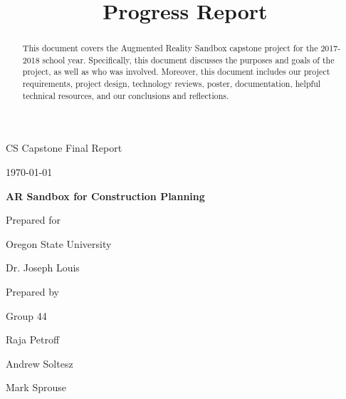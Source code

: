\documentclass[onecolumn, draftclsnofoot,10pt, compsoc]{IEEEtran}
\title{Progress Report}
\def \CapstoneTeamName{		Team Sandy}
\def \CapstoneTeamNumber{		44}
\def \GroupMemberOne{			Raja Petroff			}
\def \GroupMemberTwo{			Andrew Soltesz			}
\def \GroupMemberThree{			Mark Sprouse			}
\def \CapstoneProjectName{		AR Sandbox for Construction Planning}
\def \CapstoneSponsorCompany{	Oregon State University}
\def \CapstoneSponsorPerson{		Dr. Joseph Louis}
\def \DocType{		%
				Final Report
				}
\newcommand{\NameSigPair}[1]{\par
\makebox[2.75in][r]{#1} \hfil 	\makebox[3.25in]{\makebox[2.25in]{\hrulefill} \hfill		\makebox[.75in]{\hrulefill}}
\par\vspace{-12pt} \textit{\tiny\noindent
\makebox[2.75in]{} \hfil		\makebox[3.25in]{\makebox[2.25in][r]{Signature} \hfill	\makebox[.75in][r]{Date}}}}
\renewcommand{\NameSigPair}[1]{#1}
\begin{document}
\begin{titlepage}
    \begin{singlespace}
        \hfill 
        \par\vspace{.2in}
        \centering
        \scshape{
            \huge CS Capstone \DocType \par
            {\large\today}\par
            \vspace{.5in}
            \textbf{\Huge\CapstoneProjectName}\par
            \vfill
            {\large Prepared for}\par
            \Huge \CapstoneSponsorCompany\par
            \vspace{5pt}
            {\Large\NameSigPair{\CapstoneSponsorPerson}\par}
            {\large Prepared by }\par
            Group\CapstoneTeamNumber\par
            \vspace{5pt}
            {\Large
                \NameSigPair{\GroupMemberOne}\par
                \NameSigPair{\GroupMemberTwo}\par
                \NameSigPair{\GroupMemberThree}\par
            }
            \vspace{20pt}
        }
        \begin{abstract}
        This document covers the Augmented Reality Sandbox capstone project for the 2017-2018 school year. Specifically, this document discusses the purposes and goals of the project, as well as who was involved. Moreover, this document includes our project requirements, project design, technology reviews, poster, documentation, helpful technical resources, and our conclusions and reflections.
        \end{abstract}     
    \end{singlespace}
\end{titlepage}
\newpage
{}
\tableofcontents
\listoffigures
\clearpage
\end{document}
